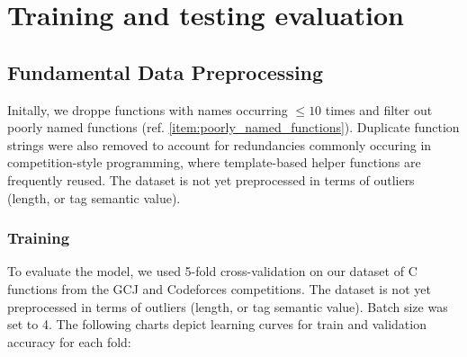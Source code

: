 \documentclass[10pt,english,a4paper]{report}
\begin{document}
\chapter{Training and testing evaluation}
\label{item:chapter_testing}

\section{Fundamental Data Preprocessing}
Initally, we droppe functions with names occurring $\leq 10$ times and filter out poorly named functions (ref. \ref{item:poorly_named_functions}).
Duplicate function strings were also removed to account for redundancies
commonly occuring in competition-style programming, where template-based
helper functions are frequently reused.
The dataset is not yet preprocessed in terms of outliers (length, or tag semantic value).


\subsection{Training}

To evaluate the model, we used 5-fold cross-validation on our dataset of
C functions from the GCJ and Codeforces competitions. The dataset is not yet
preprocessed in terms of outliers (length, or tag semantic value). Batch size was set to 4.
The following charts depict learning curves for train and validation accuracy for each fold:
\end{document}
